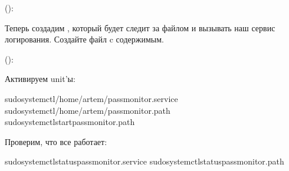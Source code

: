 \documentclass[letterpaper,10pt,russian]{sphinxmanual}
\begin{document}
\sphinxAtStartPar
():

\begin{sphinxVerbatim}[commandchars=\\\{\}]


\end{sphinxVerbatim}

\sphinxAtStartPar
Теперь создадим , который будет следит за файлом и вызывать наш сервис логирования. Создайте файл  c содержимым.

\sphinxAtStartPar
():

\begin{sphinxVerbatim}[commandchars=\\\{\}]


\end{sphinxVerbatim}

\sphinxAtStartPar
Активируем unit’ы:

\begin{sphinxVerbatim}[commandchars=\\\{\}]
sudosystemctl/home/artem/pass\PYGZus{}monitor.service
sudosystemctl/home/artem/pass\PYGZus{}monitor.path
sudosystemctlstartpass\PYGZus{}monitor.path
\end{sphinxVerbatim}

\sphinxAtStartPar
Проверим, что все работает:

\begin{sphinxVerbatim}[commandchars=\\\{\}]
sudosystemctlstatuspass\PYGZus{}monitor.service
sudosystemctlstatuspass\PYGZus{}monitor.path
\end{sphinxVerbatim}
\end{document}
